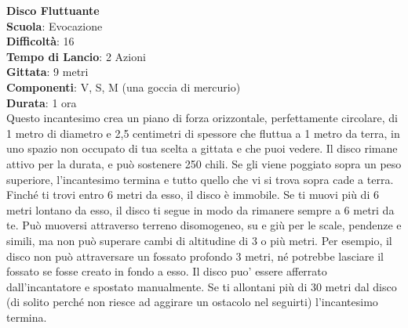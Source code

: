 \begin{multicols}{2}
\medskip\textbf{Disco Fluttuante}\\
\textbf{Scuola}: Evocazione\\
\textbf{Difficoltà}: 16\\
\textbf{Tempo di Lancio}: 2 Azioni\\
\textbf{Gittata}: 9 metri\\
\textbf{Componenti}: V, S, M (una goccia di mercurio)\\
\textbf{Durata}: 1 ora\\
Questo incantesimo crea un piano di forza orizzontale, perfettamente circolare, di 1 metro di diametro e 2,5 centimetri di spessore che fluttua a 1 metro da terra, in uno spazio non occupato di tua scelta a gittata e che puoi vedere. Il disco rimane attivo per la durata, e può sostenere 250 chili. Se gli viene poggiato sopra un peso superiore, l'incantesimo termina e tutto quello che vi si trova sopra cade a terra. Finché ti trovi entro 6 metri da esso, il disco è immobile. Se ti muovi più di 6 metri lontano da esso, il disco ti segue in modo da rimanere sempre a 6 metri da te. Può muoversi attraverso terreno disomogeneo, su e giù per le scale, pendenze e simili, ma non può superare cambi di altitudine di 3 o più metri. Per esempio, il disco non può attraversare un fossato profondo 3 metri, né potrebbe lasciare il fossato se fosse creato in fondo a esso. Il disco puo' essere afferrato dall'incantatore e spostato manualmente. Se ti allontani più di 30 metri dal disco (di solito perché non riesce ad aggirare un ostacolo nel seguirti) l'incantesimo termina.


\end{multicols}
